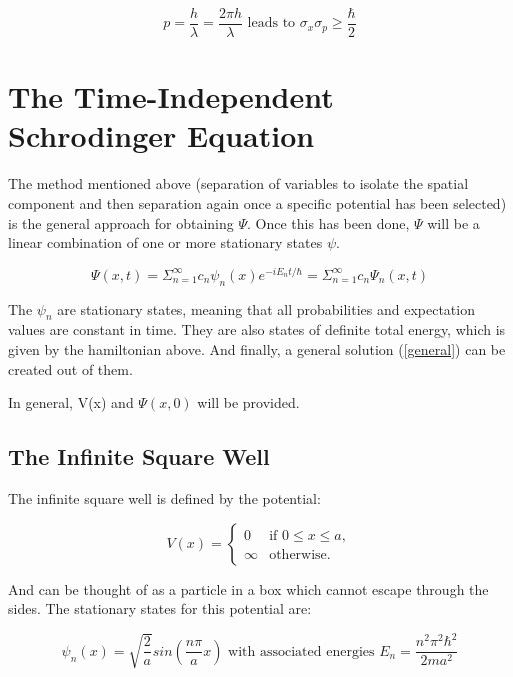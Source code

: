 \documentclass[aps,pre,nofootinbib]{revtex4}
\begin{document}
\begin{equation}
p = \frac{h}{\lambda} = \frac{2 \pi h}{\lambda} \textrm{   leads to   } \sigma_x \sigma_p \geq \frac{\hbar}{2}
\end{equation}

\section{The Time-Independent Schrodinger Equation}

The method mentioned above (separation of variables to isolate the spatial component and then separation again once a specific potential has been selected) is the general approach for obtaining $\Psi$.  Once this has been done, $\Psi$ will be a linear combination of one or more stationary states $\psi$.  

\begin{equation}
\label{general}
\Psi(x,t) = \Sigma^{\infty}_{n=1}c_n\psi_n(x)e^{-iE_nt/\hbar} = \Sigma^{\infty}_{n=1}c_n\Psi_n(x,t)
\end{equation}

The $\psi_n$ are stationary states, meaning that all probabilities and expectation values are constant in time.  They are also states of definite total energy, which is given by the hamiltonian above.  And finally, a general solution (\ref{general}) can be created out of them.  

In general, V(x) and $\Psi(x,0)$ will be provided.  

\subsection{The Infinite Square Well}

The infinite square well is defined by the potential:

\begin{equation} 
V(x)= 
\begin{cases} 
0 & \text{if $0\le x\le a$}, \\ 
\infty & \text{otherwise}. 
\end{cases} 
\end{equation} 

And can be thought of as a particle in a box which cannot escape through the sides.  The stationary states for this potential are:

\begin{equation}
\psi_n(x) = \sqrt{\frac{2}{a}}sin({\frac{n\pi}{a}x}) \textrm{  with associated energies  } E_n = \frac{n^2 \pi^2 \hbar^2}{2ma^2}
\end{equation}
\end{document}
